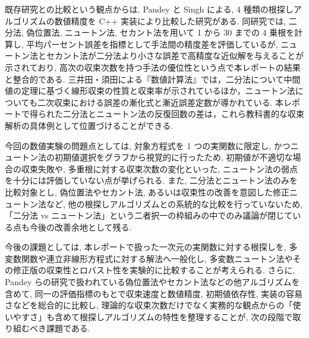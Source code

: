 \documentclass[a4paper,fontsize=11pt,line_length=40zw,number_of_lines=35,baselineskip=1.7zw]{jlreq}
\begin{document}
既存研究との比較という観点からは, Pandey と Singh による, 4 種類の根探しアルゴリズムの数値精度を C++ 実装により比較した研究がある.\cite{pandey2024ComparisonNumericalAccuracy}
同研究では, 二分法, 偽位置法, ニュートン法, セカント法を用いて 1 から 30 までの 4 乗根を計算し, 平均パーセント誤差を指標として手法間の精度差を評価しているが, 
ニュートン法とセカント法が二分法より小さな誤差で高精度な近似解を与えることが示されており, 高次の収束次数を持つ手法の優位性という点で本レポートの結果と整合的である.\cite{pandey2024ComparisonNumericalAccuracy}
三井田・須田による『数値計算法』では，二分法について中間値の定理に基づく線形収束の性質と収束率が示されているほか，ニュートン法についても二次収束における誤差の漸化式と漸近誤差定数が導かれている.\cite{三井田2014数値計算法}  
本レポートで得られた二分法とニュートン法の反復回数の差は，これら教科書的な収束解析の具体例として位置づけることができる.

今回の数値実験の問題点としては, 対象方程式を 1 つの実関数に限定し, かつニュートン法の初期値選択をグラフから視覚的に行ったため, 初期値が不適切な場合の収束失敗や, 多重根に対する収束次数の変化といった, ニュートン法の弱点を十分には評価していない点が挙げられる.\cite{embree2020Lecture30} 
また, 二分法とニュートン法のみを比較対象とし, 偽位置法やセカント法, あるいは収束性の改善を意図した修正ニュートン法など, 他の根探しアルゴリズムとの系統的な比較を行っていないため, 「二分法 vs ニュートン法」という二者択一の枠組みの中でのみ議論が閉じている点も今後の改善余地として残る.\cite{pandey2024ComparisonNumericalAccuracy}

今後の課題としては, 本レポートで扱った一次元の実関数に対する根探しを, 多変数関数や連立非線形方程式に対する解法へ一般化し, 多変数ニュートン法やその修正版の収束性とロバスト性を実験的に比較することが考えられる.\cite{gavva2020NUMERICALANALYSIS} 
さらに, Pandey らの研究で扱われている偽位置法やセカント法などの他アルゴリズムを含めて, 同一の評価指標のもとで収束速度と数値精度, 初期値依存性, 実装の容易さなどを総合的に比較し, 理論的な収束次数だけでなく実務的な観点からの「使いやすさ」も含めて根探しアルゴリズムの特性を整理することが, 次の段階で取り組むべき課題である.\cite{pandey2024ComparisonNumericalAccuracy}

\printbibliography[title=参考文献]
\end{document}
